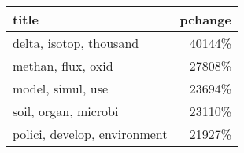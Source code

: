 \begin{tabular}{p{1.2cm}r}
\toprule
                        title &  pchange \\
\midrule
      delta, isotop, thousand &   40144\% \\
           methan, flux, oxid &   27808\% \\
            model, simul, use &   23694\% \\
         soil, organ, microbi &   23110\% \\
 polici, develop, environment &   21927\% \\
\bottomrule
\end{tabular}
